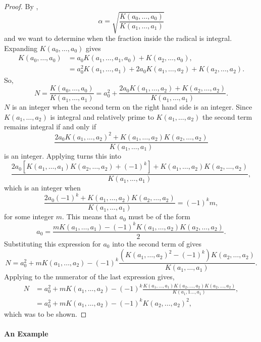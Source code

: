 \begin{proof}
By , 
\[
\alpha = \sqrt{\frac{K(a_0, \ldots, a_0)}{K(a_1, \ldots, a_1)}}
\]
and we want to determine when the fraction inside the radical is
integral. Expanding $K(a_0, \ldots, a_0)$ gives 
\[
\begin{aligned}
 K(a_0, \ldots, a_0) 
   & = a_0 K(a_1, \ldots, a_1, a_0) + K(a_2, \ldots,a_0), \\
   & = a_0^2 K(a_1, \ldots, a_1) + 2a_0 K(a_1, \ldots, a_2)
           + K(a_2, \ldots, a_2).
\end{aligned}
\]
So,
\begin{equation}\label{CF:Muir:Rad:Eq}
N = \frac{K(a_0, \ldots, a_0)}{K(a_1, \ldots, a_1)} =
 a_0^2 + \frac{2a_0 K(a_1, \ldots, a_2) + K(a_2, \ldots, a_2)}{K(a_1,
\ldots, a_1)}.
\end{equation}
$N$ is an integer when the second term on the right hand side is an
integer.  Since $K(a_1, \ldots, a_2)$ is integral and relatively prime
to $K(a_1, \ldots, a_2)$ the second term remains integral if and only if
\[
\frac{2 a_0 K(a_1, \ldots, a_2)^2 + K(a_1, \ldots, a_2) K(a_2, \ldots,
a_2)}{K(a_1, \ldots, a_1)}
\]
is an integer. Applying  turns this into
\[
\frac{2a_0\left[K(a_1, \ldots, a_1) K(a_2, \ldots, a_2) +
(-1)^k\right]
  + K(a_1, \ldots, a_2) K(a_2, \ldots, a_2)}{K(a_1, \ldots, a_1)},
\]
which is an integer when 
\[
\frac{2 a_0 (-1)^k + K(a_1, \ldots, a_2) K(a_2, \ldots, a_2)}{K(a_1,
\ldots, a_1)} = (-1)^k m,
\]
for some integer $m$.  This means that $a_0$ must be of the form
\[
a_0 = \frac{m K(a_1, \ldots, a_1) - (-1)^k K(a_1, \ldots, a_2) K(a_2,
\ldots, a_2)}{2}.
\]
Substituting this expression for $a_0$ into the second term of
 gives 
\[
N = a_0^2 + mK(a_1, \ldots, a_2) 
- (-1)^k 
\frac{\left(K(a_1, \ldots, a_2)^2 - (-1)^k\right) K(a_2, \ldots, a_2)}{K(a_1,
\ldots, a_1)}.
\]
Applying  to the numerator of the last
expression gives,
\[
\begin{aligned}
N & = a_0^2 + mK(a_1, \ldots, a_2) 
- (-1)^k 
\frac{K(a_1, \ldots, a_1) K(a_2, \ldots, a_2) K(a_2, \ldots, a_2)}{K(a_1,1
\ldots, a_1)}, \\
 & = a_0^2 + m K(a_1, \ldots, a_2) - (-1)^k K(a_2, \ldots, a_2)^2,
\end{aligned}
\]
which was to be shown.
\end{proof}

\paragraph{An Example}

